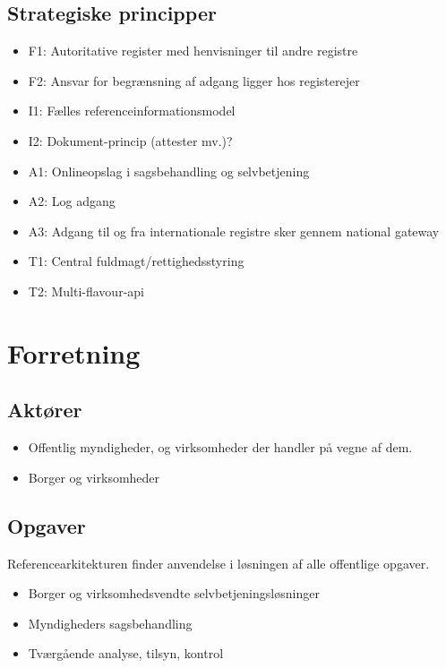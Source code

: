 \subsection{Strategiske principper}\label{strategiske-principper}

\begin{itemize}
\tightlist
\item
  F1: Autoritative register med henvisninger til andre registre
\item
  F2: Ansvar for begrænsning af adgang ligger hos registerejer
\item
  I1: Fælles referenceinformationsmodel
\item
  I2: Dokument-princip (attester mv.)?
\item
  A1: Onlineopslag i sagsbehandling og selvbetjening
\item
  A2: Log adgang
\item
  A3: Adgang til og fra internationale registre sker gennem national
  gateway
\item
  T1: Central fuldmagt/rettighedsstyring
\item
  T2: Multi-flavour-api
\end{itemize}

\section{Forretning}\label{forretning}

\subsection{Aktører}\label{aktuxf8rer}

\begin{itemize}
\tightlist
\item
  Offentlig myndigheder, og virksomheder der handler på vegne af dem.
\item
  Borger og virksomheder
\end{itemize}

\subsection{Opgaver}\label{opgaver}

Referencearkitekturen finder anvendelse i løsningen af alle offentlige
opgaver.

\begin{itemize}
\tightlist
\item
  Borger og virksomhedsvendte selvbetjeningsløsninger
\item
  Myndigheders sagsbehandling
\item
  Tværgående analyse, tilsyn, kontrol
\end{itemize}


